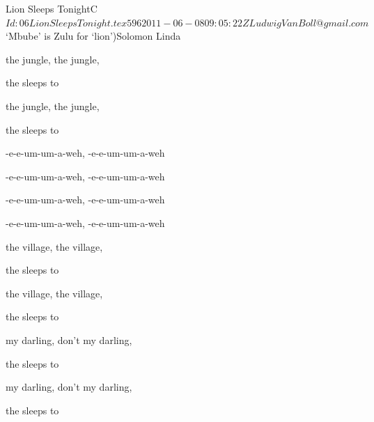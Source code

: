 \begin{SBSong}{Lion  Sleeps Tonight}{C}
    {$Id: 06LionSleepsTonight.tex 596 2011-06-08 09:05:22Z LudwigVanBoll@gmail.com $}
    {`Mbube' is Zulu for `lion')}{Solomon Linda}
  \begin{SBVerse}
     the jungle, the  jungle, 

    the  sleeps to  

    the jungle, the  jungle, 

    the  sleeps to  
  \end{SBVerse}
  \begin{SBChorus}
    -e-e-um-um-a-weh, -e-e-um-um-a-weh
  
	-e-e-um-um-a-weh, -e-e-um-um-a-weh
	
    -e-e-um-um-a-weh, -e-e-um-um-a-weh
  
	-e-e-um-um-a-weh, -e-e-um-um-a-weh
  \end{SBChorus}  
  \begin{SBVerse}
     the village, the  village, 

    the  sleeps to  
    
     the village, the  village, 

    the  sleeps to  
  \end{SBVerse}
  \begin{SBVerse}
    
     my darling, don't  my darling, 
    
    the  sleeps to  

     my darling, don't  my darling, 

    the  sleeps to  
  \end{SBVerse}
\end{SBSong}

